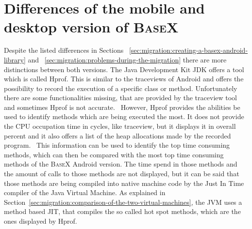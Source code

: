 
\section{Differences of the mobile and desktop version of \textsc{BaseX}}
\label{sec:differences-of-the-two-basex-versions}
Despite the listed differences in Sections ~\ref{sec:migration:creating-a-basex-android-library} and ~\ref{sec:migration:problems-during-the-migration} there are more distinctions between both versions.
The Java Development Kit JDK offers a tool which is called Hprof.
This is similar to the traceviews of Android and offers the possibility to record the execution of a specific class or method.
Unfortunately there are some functionalities missing, that are provided by the traceview tool and sometimes Hprof is not accurate.~\cite{mytkowicz2010evaluating}
However, Hprof provides the abilities be used to identify methods which are being executed the most.
It does not provide the CPU occupation time in cycles, like traceview, but it displays it in overall percent and it also offers a list of the heap allocations made by the recorded program.~\cite{liang1999comprehensive}
This information can be used to identify the top time consuming methods, which can then be compared with the most top time consuming methods of the \textsc{BaseX} Android version.
The time spend in those methods and the amount of calls to those methods are not displayed, but it can be said that those methods are being compiled into native machine code by the Just In Time compiler of the Java Virtual Machine.
As explained in Section~\ref{sec:migration:comparison-of-the-two-virtual-machines}, the JVM uses a method based JIT, that compiles the so called hot spot methods, which are the ones displayed by Hprof. 


